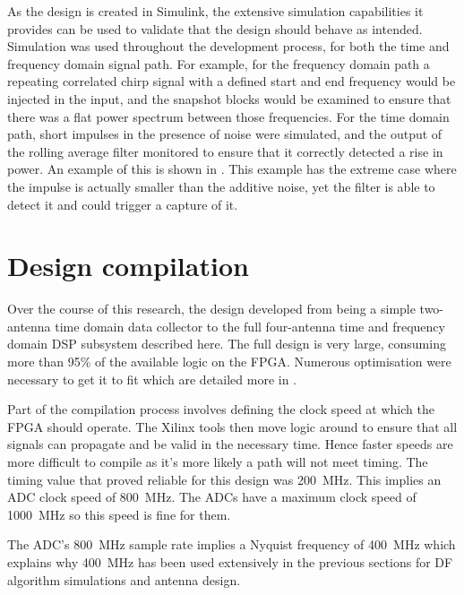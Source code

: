 As the design is created in Simulink, the extensive simulation capabilities it provides can be used to validate that the design should behave as intended. Simulation was used throughout the development process, for both the time and frequency domain signal path. For example, for the frequency domain path a repeating correlated chirp signal with a defined start and end frequency would be injected in the input, and the snapshot blocks would be examined to ensure that there was a flat power spectrum between those frequencies. For the time domain path, short impulses in the presence of noise were simulated, and the output of the rolling average filter monitored to ensure that it correctly detected a rise in power. An example of this is shown in . This example has the extreme case where the impulse is actually smaller than the additive noise, yet the filter is able to detect it and could trigger a capture of it.

\section{Design compilation}
Over the course of this research, the design developed from being a simple two-antenna time domain data collector to the full four-antenna time and frequency domain DSP subsystem described here. The full design is very large, consuming more than 95\% of the available logic on the FPGA. Numerous optimisation were necessary to get it to fit which are detailed more in .

Part of the compilation process involves defining the clock speed at which the FPGA should operate. The Xilinx tools then move logic around to ensure that all signals can propagate and be valid in the necessary time. Hence faster speeds are more difficult to compile as it's more likely a path will not meet timing. The timing value that proved reliable for this design was \SI{200}{\mega\hertz}. This implies an ADC clock speed of \SI{800}{\mega\hertz}. The ADCs have a maximum clock speed of \SI{1000}{\mega\hertz} so this speed is fine for them. 

The ADC's \SI{800}{\mega\hertz} sample rate implies a Nyquist frequency of \SI{400}{\mega\hertz} which explains why \SI{400}{\mega\hertz} has been used extensively in the previous sections for DF algorithm simulations and antenna design.



